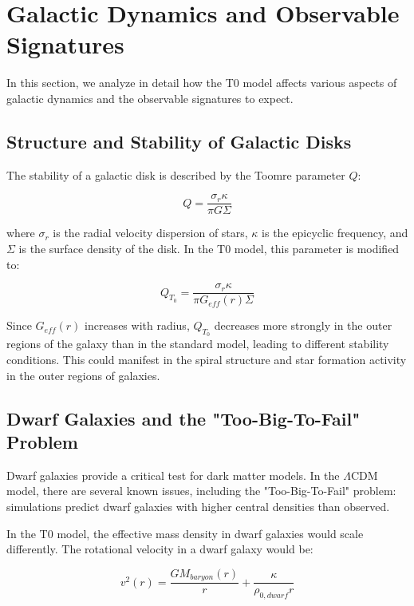 \documentclass[a4paper,12pt]{article}
\begin{document}
	\section{Galactic Dynamics and Observable Signatures}
	
	In this section, we analyze in detail how the T0 model affects various aspects of galactic dynamics and the observable signatures to expect.
	
	\subsection{Structure and Stability of Galactic Disks}
	
	The stability of a galactic disk is described by the Toomre parameter $Q$:
	
	\begin{equation}
		Q = \frac{\sigma_r \kappa}{\pi G \Sigma}
	\end{equation}
	
	where $\sigma_r$ is the radial velocity dispersion of stars, $\kappa$ is the epicyclic frequency, and $\Sigma$ is the surface density of the disk. In the T0 model, this parameter is modified to:
	
	\begin{equation}
		Q_{T_0} = \frac{\sigma_r \kappa}{\pi G_{eff}(r) \Sigma}
	\end{equation}
	
	Since $G_{eff}(r)$ increases with radius, $Q_{T_0}$ decreases more strongly in the outer regions of the galaxy than in the standard model, leading to different stability conditions. This could manifest in the spiral structure and star formation activity in the outer regions of galaxies.
	
	\subsection{Dwarf Galaxies and the "Too-Big-To-Fail" Problem}
	
	Dwarf galaxies provide a critical test for dark matter models. In the $\Lambda$CDM model, there are several known issues, including the "Too-Big-To-Fail" problem: simulations predict dwarf galaxies with higher central densities than observed.
	
	In the T0 model, the effective mass density in dwarf galaxies would scale differently. The rotational velocity in a dwarf galaxy would be:
	
	\begin{equation}
		v^2(r) = \frac{GM_{baryon}(r)}{r} + \frac{\kappa}{\rho_{0,dwarf}r}
	\end{equation}
	
\end{document}

